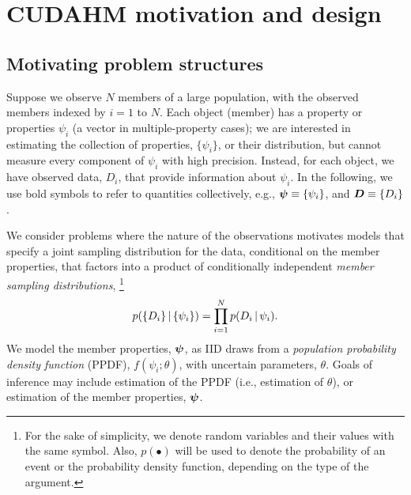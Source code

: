 \section{CUDAHM motivation and design}
\label{sec:design}

\subsection{Motivating problem structures}
\label{sec:motiv}

Suppose we observe $N$ members of a large population, with the observed members indexed by $i=1$ to $N$.
Each object (member) has a property or properties $\psi_i$ (a vector in multiple-property cases); we are interested in estimating the collection of properties, $\{\psi_i\}$, or their distribution, but cannot measure every component of $\psi_i$ with high precision.
Instead, for each object, we have observed data, $D_i$, that provide information about $\psi_i$.
In the following, we use bold symbols to refer to quantities collectively, e.g., $\boldsymbol{\psi} \equiv \{\psi_i\}$, and $\boldsymbol{D} \equiv \{D_i\}$.

We consider problems where the nature of the observations motivates models that specify a joint sampling distribution for the data, conditional on the member properties, that factors into a product of conditionally independent \emph{member sampling distributions},%
\footnote{For the sake of simplicity, we denote random variables and their values with the same symbol.
Also, $p(\bullet)$ will be used to denote the probability of an event or the probability density function, depending on the type of the argument.}
\begin{equation}
p(\{D_i\} \,|\, \{\psi_i\}) = \prod_{i=1}^N p(D_i \,|\, \psi_i).
\label{data-joint-member}
\end{equation}
We model the member properties, $\boldsymbol{\psi}$, as IID draws from a \emph{population probability density function} (PPDF), $f(\psi_i;\theta)$, with uncertain parameters, $\theta$.
Goals of inference may include estimation of the PPDF (i.e., estimation of $\theta$), or estimation of the member properties, $\boldsymbol{\psi}$.


